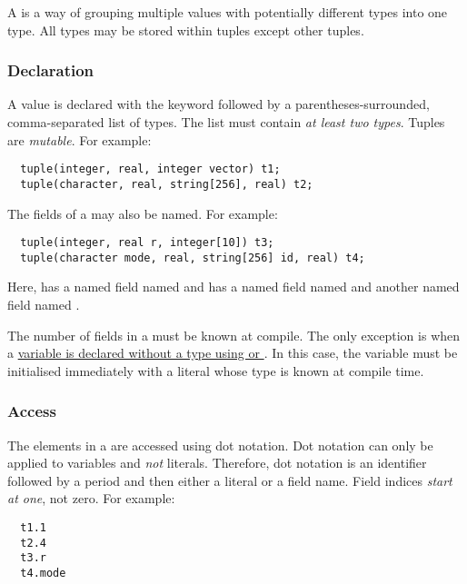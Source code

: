 \documentclass[types.tex]{subfiles}
\begin{document}
A  is a way of grouping multiple values with potentially different types into one type.
All types may be stored within tuples except other tuples.

\subsubsection{Declaration}
\label{sssec:tuple_decl}
A  value is declared with the keyword  followed by a parentheses-surrounded,
comma-separated list of types. The list must contain \textit{at least two types}. Tuples are
\textit{mutable}. For example:
\begin{lstlisting}
  tuple(integer, real, integer vector) t1;
  tuple(character, real, string[256], real) t2;
\end{lstlisting}


The fields of a  may also be named. For example:
\begin{lstlisting}
  tuple(integer, real r, integer[10]) t3;
  tuple(character mode, real, string[256] id, real) t4;
\end{lstlisting}

Here,  has a named  field named  and  has a named
 field named  and another named  field named .

The number of fields in a  must be known at compile. The only exception is when a
\hyperref[sec:typeQualifiers]{variable is declared without a type using  or }.
In this case, the variable must be initialised immediately with a literal whose type is known at
compile time.


\subsubsection{Access}
\label{sssec:tuple_acc}
The elements in a  are accessed using dot notation. Dot notation can only be applied to
 variables and \textit{not}  literals. Therefore, dot notation is an
identifier followed by a period and then either a literal  or a field name. Field
indices \textit{start at one}, not zero. For example:
\begin{lstlisting}
  t1.1
  t2.4
  t3.r
  t4.mode
\end{lstlisting}
\end{document}
